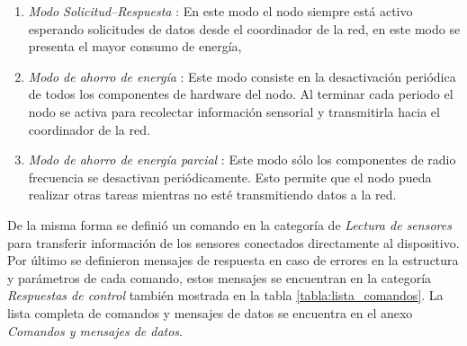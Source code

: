 \begin{enumerate}
	\item \textit{Modo Solicitud--Respuesta} : En este modo el nodo siempre está activo esperando solicitudes de datos desde el coordinador de la red, en este modo se presenta el mayor consumo de energía,  
	\item \textit{Modo de ahorro de energía} : Este modo consiste en la desactivación periódica de todos los componentes de hardware del nodo. Al terminar cada periodo el nodo se activa para recolectar información sensorial y transmitirla hacia el coordinador de la red. 
	\item \textit{Modo de ahorro de energía parcial} : Este modo sólo los componentes de radio frecuencia se desactivan periódicamente. Esto permite que el nodo pueda realizar otras tareas mientras no esté transmitiendo datos a la red. 
\end{enumerate}

De la misma forma se definió un comando en la categoría de \textit{Lectura de sensores} para transferir información de los sensores conectados directamente al dispositivo. Por último se definieron mensajes de respuesta en caso de errores en la estructura y parámetros de cada comando, estos mensajes se encuentran en la categoría \textit{Respuestas de control} también mostrada en la tabla \ref{tabla:lista_comandos}. La lista completa de comandos y mensajes de datos se encuentra en el anexo \textit{Comandos y mensajes de datos}.

